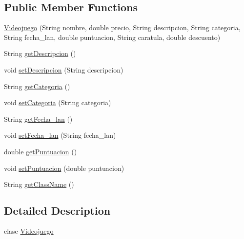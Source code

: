 \subsection*{Public Member Functions}
\begin{DoxyCompactItemize}
\item 
\mbox{\hyperlink{classes_1_1deusto_1_1client_1_1data_1_1_videojuego_a3c1bfa0970b9b95f70b275524991e55b}{Videojuego}} (String nombre, double precio, String descripcion, String categoria, String fecha\+\_\+lan, double puntuacion, String caratula, double descuento)
\item 
String \mbox{\hyperlink{classes_1_1deusto_1_1client_1_1data_1_1_videojuego_aa59770ccaee19a0a506f2cc4b198fc8c}{get\+Descripcion}} ()
\item 
void \mbox{\hyperlink{classes_1_1deusto_1_1client_1_1data_1_1_videojuego_ad0f981f036e41c7a392c1d966ea01938}{set\+Descripcion}} (String descripcion)
\item 
String \mbox{\hyperlink{classes_1_1deusto_1_1client_1_1data_1_1_videojuego_abf413cb4191361225d1209c0fbe2d744}{get\+Categoria}} ()
\item 
void \mbox{\hyperlink{classes_1_1deusto_1_1client_1_1data_1_1_videojuego_a7527cea1f103fb1e1b98dd944b74fc70}{set\+Categoria}} (String categoria)
\item 
String \mbox{\hyperlink{classes_1_1deusto_1_1client_1_1data_1_1_videojuego_af34689312bb43526606fbcd98994d4a0}{get\+Fecha\+\_\+lan}} ()
\item 
void \mbox{\hyperlink{classes_1_1deusto_1_1client_1_1data_1_1_videojuego_acfa6a8be622eba125fc9056e41a2b15c}{set\+Fecha\+\_\+lan}} (String fecha\+\_\+lan)
\item 
double \mbox{\hyperlink{classes_1_1deusto_1_1client_1_1data_1_1_videojuego_ad6beb0918c8986f14a545c2902db6c52}{get\+Puntuacion}} ()
\item 
void \mbox{\hyperlink{classes_1_1deusto_1_1client_1_1data_1_1_videojuego_acc70cd7111df8d5900a243114f96ad1c}{set\+Puntuacion}} (double puntuacion)
\item 
String \mbox{\hyperlink{classes_1_1deusto_1_1client_1_1data_1_1_videojuego_a0866278d84685cf5d856c6003883d65b}{get\+Class\+Name}} ()
\end{DoxyCompactItemize}


\subsection{Detailed Description}
clase \mbox{\hyperlink{classes_1_1deusto_1_1client_1_1data_1_1_videojuego}{Videojuego}} 


